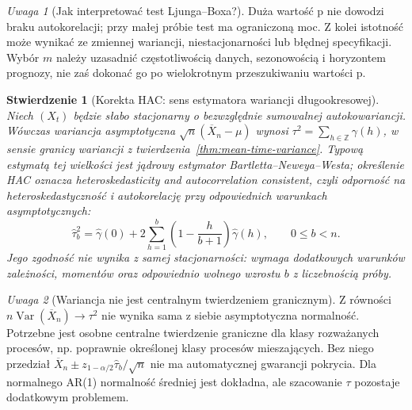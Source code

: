 \documentclass[11pt,a4paper,oneside]{report}
\numberwithin{equation}{chapter}
\theoremstyle{plain}
\newtheorem{stwierdzenie}[twierdzenie]{Stwierdzenie}
\theoremstyle{definition}
\theoremstyle{remark}
\newtheorem{uwaga}{Uwaga}[chapter]
\newcommand{\Var}{\operatorname{Var}}
\begin{document}
\begin{uwaga}[Jak interpretować test Ljunga--Boxa?]
Duża wartość p nie dowodzi braku autokorelacji;
przy małej próbie test ma ograniczoną moc.
Z kolei istotność może wynikać ze zmiennej
wariancji, niestacjonarności lub błędnej specyfikacji.
Wybór $m$ należy uzasadnić częstotliwością danych,
sezonowością i horyzontem prognozy, nie zaś dokonać
go po wielokrotnym przeszukiwaniu wartości p.
\end{uwaga}

\begin{stwierdzenie}[Korekta HAC: sens estymatora wariancji długookresowej]
\label{prop:hac}
Niech $(X_t)$ będzie słabo stacjonarny o bezwzględnie
sumowalnej autokowariancji. Wówczas wariancja
asymptotyczna $\sqrt n(\overline X_n-\mu)$ wynosi
$\tau^2=\sum_{h\in\mathbb Z}\gamma(h)$, w sensie
granicy wariancji z twierdzenia~\ref{thm:mean-time-variance}.
Typową estymatą tej wielkości jest jądrowy estymator
Bartletta--Neweya--Westa; określenie HAC oznacza
\emph{heteroskedasticity and autocorrelation consistent},
czyli odporność na heteroskedastyczność i autokorelację
przy odpowiednich warunkach asymptotycznych:
\[
 \widehat\tau^2_b=\widehat\gamma(0)+
 2\sum_{h=1}^{b}\left(1-\frac{h}{b+1}\right)
 \widehat\gamma(h),\qquad 0\le b<n.
\]
Jego \emph{zgodność} nie wynika z samej stacjonarności:
wymaga dodatkowych warunków zależności, momentów oraz
odpowiednio wolnego wzrostu $b$ z liczebnością próby.
\end{stwierdzenie}

\begin{uwaga}[Wariancja nie jest centralnym twierdzeniem granicznym]
Z równości $n\Var(\overline X_n)\to\tau^2$
nie wynika sama z siebie asymptotyczna normalność.
Potrzebne jest osobne centralne twierdzenie graniczne
dla klasy rozważanych procesów, np. poprawnie określonej
klasy procesów mieszających. Bez niego przedział
$\overline X_n\pm z_{1-\alpha/2}\widehat\tau_b/\sqrt n$
nie ma automatycznej gwarancji pokrycia. Dla
normalnego AR(1) normalność średniej jest dokładna,
ale szacowanie $\tau$ pozostaje dodatkowym problemem.
\end{uwaga}
\end{document}
